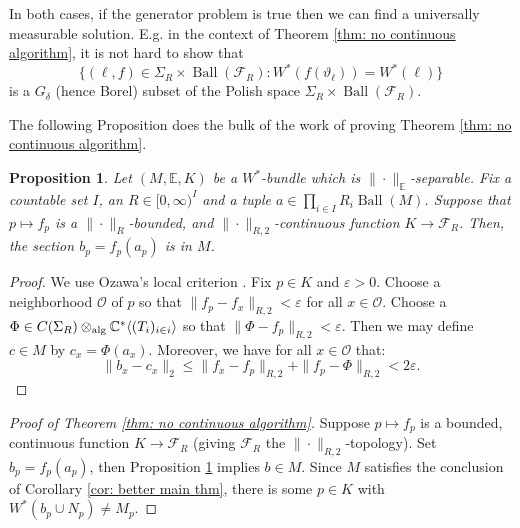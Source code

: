 \documentclass[10pt]{amsart}
\newtheorem{prop}[thm]{Proposition}
\theoremstyle{definition}
\numberwithin{equation}{section}
\newcommand{\bC}{{\mathbb C}}
\newcommand{\bE}{{\mathbb E}}
\newcommand{\cF}{{\mathcal F}}
\DeclareMathOperator{\Ball}{Ball}
\DeclarePairedDelimiter{\ip}{\langle}{\rangle}
\begin{document}
In both cases, if the generator problem is true then we can find a universally measurable solution. E.g. in the context of Theorem \ref{thm: no continuous algorithm}, it is not hard to show that 
\[\{(\ell,f)\in\Sigma_{R}\times \Ball(\cF_{R}):W^{*}(f(\vartheta_{\ell}))=W^{*}(\ell)\}\]
is a $G_{\delta}$ (hence Borel) subset of the Polish space $\Sigma_{R}\times \Ball(\cF_{R})$. 

The following Proposition does the bulk of the work of proving Theorem \ref{thm: no continuous algorithm}.

\begin{prop}\label{prop: preserving continuous functions}
Let $(M,\bE,K)$ be a $W^{*}$-bundle which is $\|\cdot\|_{\bE}$-separable. Fix a countable set $I$, an $R\in [0,\infty)^{I}$ and a tuple $a\in \prod_{i\in I}R_{i}\Ball(M)$.
Suppose that $p\mapsto f_{p}$ is a $\|\cdot\|_{R}$-bounded,  and $\|\cdot\|_{R,2}$-continuous function $K\to \cF_{R}$. Then, the section $b_{p}=f_{p}(a_{p})$ is in $M$. 
\end{prop}

\begin{proof}
We use Ozawa's local criterion \cite[Theorem 11]{OzawaBundle}.
Fix $p\in K$ and $\varepsilon>0$.  Choose a neighborhood $\mathcal{O}$ of $p$ so that $\|f_{p}-f_{x}\|_{R,2}<\varepsilon$ for all $x\in \mathcal{O}$. Choose a $\Phi\in C(\Sigma_{R})\otimes_{\textnormal{alg}}\bC^{*}\ip{(T_{i})_{i\in i}}$ so that $\|\Phi-f_{p}\|_{R,2}<\varepsilon$. Then we may define $c\in M$ by $c_{x}=\Phi(a_{x})$. Moreover, we have for all $x\in \mathcal{O}$ that:
\[\|b_{x}-c_{x}\|_{2}\leq \|f_{x}-f_{p}\|_{R,2}+\|f_{p}-\Phi\|_{R,2}<2\varepsilon.\]



\end{proof}

\begin{proof}[Proof of Theorem \ref{thm: no continuous algorithm}]
Suppose $p\mapsto f_{p}$ is a bounded, continuous function $K\to \cF_{R}$ (giving $\cF_{R}$ the $\|\cdot\|_{R,2}$-topology). Set $b_{p}=f_{p}(a_{p})$, then Proposition \ref{prop: preserving continuous functions} implies $b\in M$. Since $M$ satisfies the conclusion of Corollary \ref{cor: better main thm},  there is some $p\in K$ with $W^{*}(b_{p}\cup N_{p})\neq M_{p}$. 


\end{proof}
\end{document}
